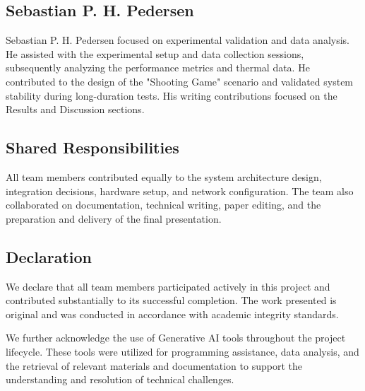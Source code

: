 \documentclass[conference]{IEEEtran}
\begin{document}
\subsection*{Sebastian P. H. Pedersen}
Sebastian P. H. Pedersen focused on experimental validation and data analysis. He assisted with the experimental setup and data collection sessions, subsequently analyzing the performance metrics and thermal data. He contributed to the design of the "Shooting Game" scenario and validated system stability during long-duration tests. His writing contributions focused on the Results and Discussion sections.

\subsection*{Shared Responsibilities}
All team members contributed equally to the system architecture design, integration decisions, hardware setup, and network configuration. The team also collaborated on documentation, technical writing, paper editing, and the preparation and delivery of the final presentation.

\subsection*{Declaration}
We declare that all team members participated actively in this project and contributed substantially to its successful completion. The work presented is original and was conducted in accordance with academic integrity standards.

We further acknowledge the use of Generative AI tools throughout the project lifecycle. These tools were utilized for programming assistance, data analysis, and the retrieval of relevant materials and documentation to support the understanding and resolution of technical challenges.
\end{document}
